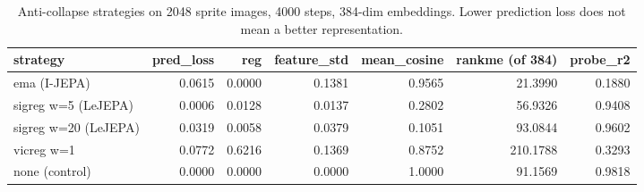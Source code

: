 \begin{table}[t]
\centering
\begin{tabular}{lrrrrrr}
\toprule
strategy & pred\_loss & reg & feature\_std & mean\_cosine & rankme (of 384) & probe\_r2 \\
\midrule
ema (I-JEPA) & 0.0615 & 0.0000 & 0.1381 & 0.9565 & 21.3990 & 0.1880 \\
sigreg w=5 (LeJEPA) & 0.0006 & 0.0128 & 0.0137 & 0.2802 & 56.9326 & 0.9408 \\
sigreg w=20 (LeJEPA) & 0.0319 & 0.0058 & 0.0379 & 0.1051 & 93.0844 & 0.9602 \\
vicreg w=1 & 0.0772 & 0.6216 & 0.1369 & 0.8752 & 210.1788 & 0.3293 \\
none (control) & 0.0000 & 0.0000 & 0.0000 & 1.0000 & 91.1569 & 0.9818 \\
\bottomrule
\end{tabular}
\caption{Anti-collapse strategies on 2048 sprite images, 4000 steps, 384-dim embeddings. Lower prediction loss does not mean a better representation.}
\label{tab:collapse}
\end{table}
